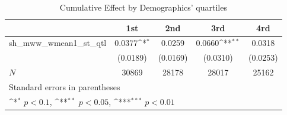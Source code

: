 \begin{table}[htbp]\centering
\def\sym#1{\ifmmode^{#1}\else\(^{#1}\)\fi}
\caption{Cumulative Effect by Demographics' quartiles}
\begin{tabular}{l*{4}{c}}
\hline\hline
            &\multicolumn{1}{c}{1st}&\multicolumn{1}{c}{2nd}&\multicolumn{1}{c}{3rd}&\multicolumn{1}{c}{4rd}\\
\hline
sh\_mww\_wmean1\_st\_qtl&      0.0377\sym{*}  &      0.0259         &      0.0660\sym{**} &      0.0318         \\
            &    (0.0189)         &    (0.0169)         &    (0.0310)         &    (0.0253)         \\
\hline
\(N\)       &       30869         &       28178         &       28017         &       25162         \\
\hline\hline
\multicolumn{5}{l}{\footnotesize Standard errors in parentheses}\\
\multicolumn{5}{l}{\footnotesize \sym{*} \(p<0.1\), \sym{**} \(p<0.05\), \sym{***} \(p<0.01\)}\\
\end{tabular}
\end{table}
